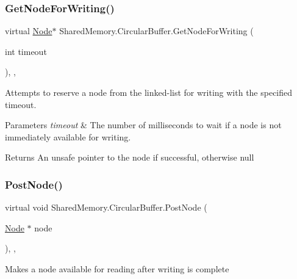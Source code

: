 \subsubsection{\texorpdfstring{Get\+Node\+For\+Writing()}{GetNodeForWriting()}}
{\footnotesize\ttfamily virtual \hyperlink{struct_shared_memory_1_1_circular_buffer_1_1_node}{Node}$\ast$ Shared\+Memory.\+Circular\+Buffer.\+Get\+Node\+For\+Writing (\begin{DoxyParamCaption}\item[{int}]{timeout }\end{DoxyParamCaption})\hspace{0.3cm}{\ttfamily [inline]}, {\ttfamily [protected]}, {\ttfamily [virtual]}}



Attempts to reserve a node from the linked-\/list for writing with the specified timeout. 


\begin{DoxyParams}{Parameters}
{\em timeout} & The number of milliseconds to wait if a node is not immediately available for writing.\\
\hline
\end{DoxyParams}
\begin{DoxyReturn}{Returns}
An unsafe pointer to the node if successful, otherwise null
\end{DoxyReturn}
\mbox{\label{class_shared_memory_1_1_circular_buffer_a76ce3579d8c7254fbd8e5b1bc32eafd1}} 
\subsubsection{\texorpdfstring{Post\+Node()}{PostNode()}}
{\footnotesize\ttfamily virtual void Shared\+Memory.\+Circular\+Buffer.\+Post\+Node (\begin{DoxyParamCaption}\item[{\hyperlink{struct_shared_memory_1_1_circular_buffer_1_1_node}{Node} $\ast$}]{node }\end{DoxyParamCaption})\hspace{0.3cm}{\ttfamily [inline]}, {\ttfamily [protected]}, {\ttfamily [virtual]}}



Makes a node available for reading after writing is complete 


